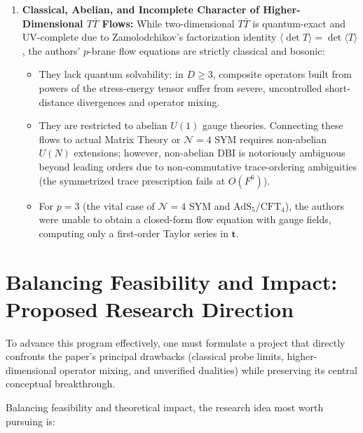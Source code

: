 \documentclass[11pt,a4paper]{article}
\begin{document}
\begin{enumerate}
    \item \textbf{Classical, Abelian, and Incomplete Character of Higher-Dimensional $T\bar{T}$ Flows:}
    While two-dimensional $T\bar{T}$ is quantum-exact and UV-complete due to Zamolodchikov's factorization identity $\langle \det T \rangle = \det \langle T \rangle$, the authors' $p$-brane flow equations are strictly classical and bosonic:
    \begin{itemize}
        \item They lack quantum solvability: in $D \ge 3$, composite operators built from powers of the stress-energy tensor suffer from severe, uncontrolled short-distance divergences and operator mixing.
        \item They are restricted to abelian $U(1)$ gauge theories. Connecting these flows to actual Matrix Theory or $\mathcal{N}=4$ SYM requires non-abelian $U(N)$ extensions; however, non-abelian DBI is notoriously ambiguous beyond leading orders due to non-commutative trace-ordering ambiguities (the symmetrized trace prescription fails at $O(F^6)$).
        \item For $p=3$ (the vital case of $\mathcal{N}=4$ SYM and $\text{AdS}_5/\text{CFT}_4$), the authors were unable to obtain a closed-form flow equation with gauge fields, computing only a first-order Taylor series in $\mathbf{t}$.
    \end{itemize}
\end{enumerate}

\section{Balancing Feasibility and Impact: Proposed Research Direction}
\label{sec:research_idea}

To advance this program effectively, one must formulate a project that directly confronts the paper's principal drawbacks (classical probe limits, higher-dimensional operator mixing, and unverified dualities) while preserving its central conceptual breakthrough.

Balancing feasibility and theoretical impact, the research idea most worth pursuing is:
\begin{center}
\end{center}
\end{document}

